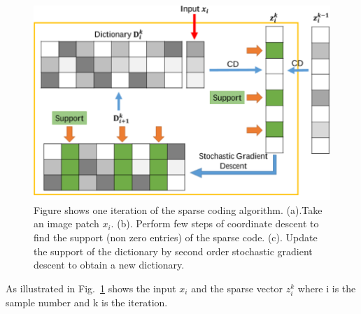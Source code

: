 \documentclass[authoryear,preprint,revi	ew,12pt]{elsarticle}
\begin{document}
\begin{figure}
	\centering
	\includegraphics[width=\linewidth]{figures/iteration}
	\caption[One Iteration of SCC]{Figure shows one iteration of the sparse coding algorithm. (a).Take an image patch $x_i$. (b). Perform few steps of coordinate descent to find the support (non zero entries) of the sparse code. (c). Update the support of the dictionary by second order stochastic gradient descent to obtain a new dictionary.}
	\label{fig:iteration}
\end{figure}

As illustrated in Fig.~\ref{fig:iteration} shows the input $ x_i $ and the sparse vector $ z^k_i $ where i is the sample number and k is the iteration.
\end{document}
